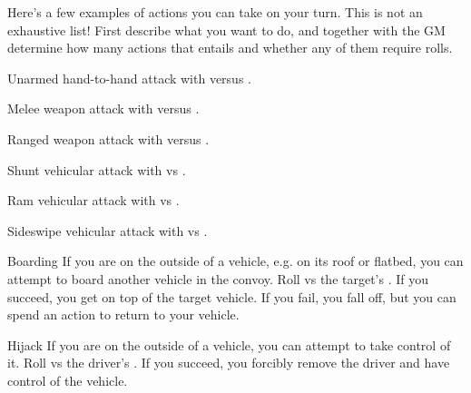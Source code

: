 
Here's a few examples of actions you can take on your turn. This is not an exhaustive list! First describe what you want to do, and together with the GM determine how many actions that entails and whether any of them require rolls.

\begin{describe}{Unarmed hand-to-hand}
  attack with \stat{\statPhysical} versus \stat{\statSkill}.
\end{describe}

\begin{describe}{Melee weapon}
  attack with \stat{\statPhysical} versus \stat{\statSkill}.
\end{describe}

\begin{describe}{Ranged weapon}
  attack with \stat{\statMental} versus \stat{\statSkill}.
\end{describe}

\hr

\begin{describe}{Shunt}
  vehicular attack with  vs .
\end{describe}

\begin{describe}{Ram}
  vehicular attack with  vs .
\end{describe}

\begin{describe}{Sideswipe}
  vehicular attack with  vs .
\end{describe}

\hr

\begin{describe}{Boarding}
  If you are on the outside of a vehicle, e.g. on its roof or flatbed, you can attempt to board another vehicle in the convoy. Roll \stat{\statSkill} vs the target's . If you succeed, you get on top of the target vehicle. If you fail, you fall off, but you can spend an action to return to your vehicle.
\end{describe}

\begin{describe}{Hijack}
  If you are on the outside of a vehicle, you can attempt to take control of it. Roll \stat{\statPhysical} vs the driver's \stat{\statSkill}. If you succeed, you forcibly remove the driver and have control of the vehicle.
\end{describe}

